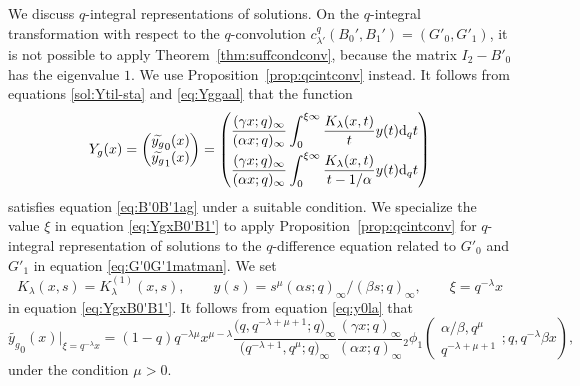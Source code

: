 \documentclass[pdftex]{sigma}
\numberwithin{equation}{section}
\theoremstyle{definition}
\begin{document}
We discuss $q$-integral representations of solutions.
On the $q$-integral transformation with respect to the $q$-convolution $c^q_{\lambda'} (B_0', B_1')= (G'_0, G'_1)$, it is not possible to apply Theorem~\ref{thm:suffcondconv}, because the matrix $I_2 -B'_0$ has the eigenvalue $1$.
We use Proposition~\ref{prop:qcintconv} instead.
It follows from equations \eqref{sol:Ytil-sta} and \eqref{eq:Yggaal} that the function
\begin{equation} \label{eq:YgxB0'B1'}
Y_g(x)
=\begin{pmatrix}
 \widetilde{y_g}_{0}(x) \\
 \widetilde{y_g}_{1}(x) \\
 \end{pmatrix}
=
\begin{pmatrix}
 \displaystyle \frac{(\gamma x; q)_{\infty}}{(\alpha x; q)_{\infty}} \int_0^{\xi \infty} \frac{K_{\lambda}(x,t)}{t} y(t) {\rm d}_q t \vspace{1mm}\\
 \displaystyle \frac{(\gamma x; q)_{\infty}}{(\alpha x; q)_{\infty}} \int_0^{\xi \infty} \frac{K_{\lambda}(x,t)}{t-1/\alpha} y(t) {\rm d}_q t
\end{pmatrix}
\end{equation}
satisfies equation \eqref{eq:B'0B'1ag} under a suitable condition.
We specialize the value $\xi $ in equation \eqref{eq:YgxB0'B1'} to apply Proposition~\ref{prop:qcintconv} for $q$-integral representation of solutions to the $q$-difference equation related to $G'_0$ and $G'_1 $ in equation \eqref{eq:G'0G'1matman}.
We set
\begin{equation} \label{eq:condPyxi}
K_{\lambda}(x, s) = K^{(1)}_{\lambda}(x, s), \qquad y(s)=s^{\mu}(\alpha s;q)_{\infty}/(\beta s;q)_{\infty} , \qquad \xi = q^{-\lambda } x
\end{equation}
in equation \eqref{eq:YgxB0'B1'}.
It follows from equation \eqref{eq:y0la} that
\begin{equation*}
\widetilde{y_g}_{0}(x) |_{\xi=q^{-\lambda}x } = (1-q) q^{-\lambda\mu} x^{\mu - \lambda} \frac{\bigl(q,q^{-\lambda+\mu+1};q\bigr)_{\infty}}{\bigl(q^{-\lambda+1},q^{\mu};q\bigr)_{\infty}} \frac{(\gamma x; q)_{\infty}}{(\alpha x; q)_{\infty}}
{}_2\phi_1 \left( \begin{matrix} \alpha/\beta, q^{\mu}\\
q^{-\lambda+\mu+1} \end{matrix} ;q,q^{-\lambda}\beta x \right) ,
\end{equation*}
under the condition $\mu >0 $.
\end{document}
